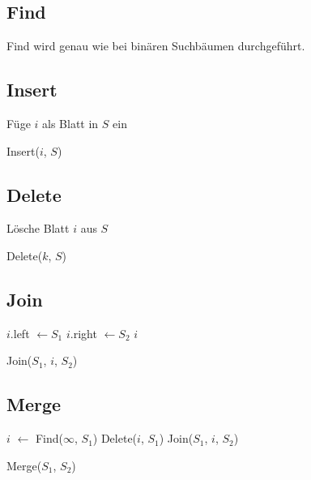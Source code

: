 \documentclass[a4paper]{scrreprt}
\theoremstyle{definition}
\begin{document}
\subsection{Find}
\label{sec:find}

Find wird genau wie bei binären Suchbäumen durchgeführt.

\subsection{Insert}
\label{sec:insert}

\begin{algorithm}[H]
		Füge $i$ als Blatt in $S$ ein \;
	\caption{Insert($i$, $S$)}
\end{algorithm}

\subsection{Delete}
\label{sec:delete}

\begin{algorithm}[H]
		Lösche Blatt $i$ aus $S$ \;
	\caption{Delete($k$, $S$)}
\end{algorithm}

\subsection{Join}
\label{sec:join}

\begin{algorithm}[H]
		$i$.left $\gets S_1$ \;
		$i$.right $\gets S_2$ \;
		\Return $i$
	\caption{Join($S_1$, $i$, $S_2$)}
\end{algorithm}

\subsection{Merge}
\label{sec:merge}

\begin{algorithm}[H]
		$i$ $\gets$ Find($\infty$, $S_1$) 
		Delete($i$, $S_1$) \;
		\Return Join($S_1$, $i$, $S_2$) \;
	\caption{Merge($S_1$, $S_2$)}
\end{algorithm}
\end{document}
